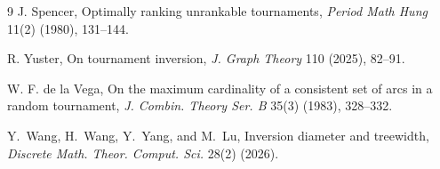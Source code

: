 \documentclass[11pt]{article}
\theoremstyle{remark}
\begin{document}
\begin{thebibliography}{9}
 J. Spencer,  Optimally ranking unrankable tournaments,  \emph{Period Math Hung} 11(2) (1980), 131--144.
 
 R. Yuster,  On tournament inversion,  \emph{J. Graph Theory}  110 (2025), 82--91.


 


  W. F. de la Vega,  On the maximum cardinality of a consistent set of arcs in a random tournament,  \emph{J.  Combin. Theory Ser. B} 35(3) (1983),  328--332.
 

Y.~Wang, H.~Wang, Y.~Yang, and M.~Lu,
Inversion diameter and treewidth,
\emph{Discrete Math. Theor. Comput. Sci.} 28(2) (2026).

\end{thebibliography}
\end{document}
